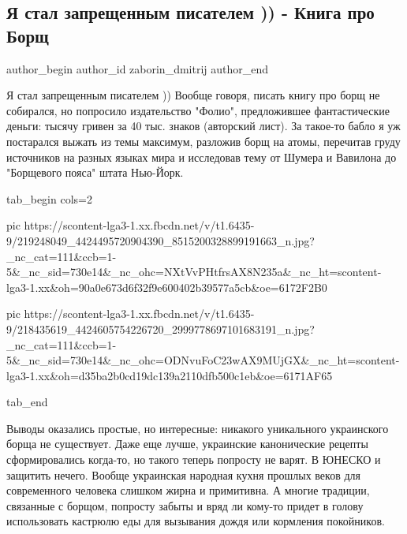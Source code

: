  
 
 
 
 
 
\subsection{Я стал запрещенным писателем )) - Книга про Борщ}
\label{sec:16_07_2021.fb.zaborin_dmitrij.1.kniga_pro_borsch_zapret}
 
\ifcmt
 author_begin
   author_id zaborin_dmitrij
 author_end
\fi

Я стал запрещенным писателем )) Вообще говоря, писать книгу про борщ не
собирался, но попросило издательство "Фолио", предложившее фантастические
деньги: тысячу гривен за 40 тыс. знаков (авторский лист). За такое-то бабло я
уж постарался выжать из темы максимум, разложив борщ на атомы, перечитав груду
источников на разных языках мира и исследовав тему от Шумера и Вавилона до
"Борщевого пояса" штата Нью-Йорк. 

\ifcmt
  tab_begin cols=2

     pic https://scontent-lga3-1.xx.fbcdn.net/v/t1.6435-9/219248049_4424495720904390_8515200328899191663_n.jpg?_nc_cat=111&ccb=1-5&_nc_sid=730e14&_nc_ohc=NXtVvPHtfrsAX8N235a&_nc_ht=scontent-lga3-1.xx&oh=90a0e673d6f32f9e600402b39577a5cb&oe=6172F2B0

     pic https://scontent-lga3-1.xx.fbcdn.net/v/t1.6435-9/218435619_4424605754226720_2999778697101683191_n.jpg?_nc_cat=111&ccb=1-5&_nc_sid=730e14&_nc_ohc=ODNvuFoC23wAX9MUjGX&_nc_ht=scontent-lga3-1.xx&oh=d35ba2b0cd19dc139a2110dfb500c1eb&oe=6171AF65

  tab_end
\fi

Выводы оказались простые, но интересные: никакого уникального украинского борща
не существует. Даже еще лучше, украинские канонические рецепты сформировались
когда-то, но такого теперь попросту не варят. В ЮНЕСКО и защитить нечего.
Вообще украинская народная кухня прошлых веков для современного человека
слишком жирна и примитивна. А многие традиции, связанные с борщом, попросту
забыты и вряд ли кому-то придет в голову использовать кастрюлю еды для
вызывания дождя или кормления покойников. 

